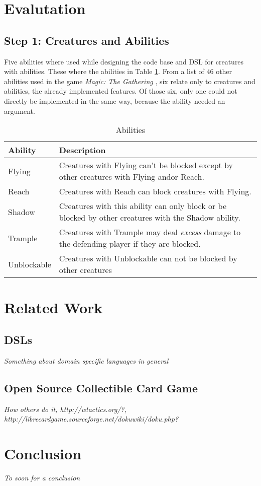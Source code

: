\documentclass[twocolumn]{phdsymp}
\begin{document}
\section{Evalutation}
\label{Evaluation}
\subsection*{Step 1: Creatures and Abilities}
Five abilities where used while designing the code base and DSL for creatures with abilities. These where the abilities in Table \ref{table:Abilities}. From a list of $46$ other abilities used in the game \textit{Magic: The Gathering} \cite{magic-abilities}, six relate only to creatures and abilities, the already implemented features. Of those six, only one could not directly be implemented in the same way, because the ability needed an argument.
\begin{table}[h]
\caption{Abilities}
\label{table:Abilities}
\begin{tabular}{|l|p{}|}
\hline
Ability & Description \\ \hline
Flying & Creatures with Flying can't be blocked except by other creatures with Flying and\/or Reach. \\
Reach & Creatures with Reach can block creatures with Flying. \\
Shadow & Creatures with this ability can only block or be  blocked by other creatures with the Shadow ability. \\
Trample & Creatures with Trample may deal \textit{excess} damage to the defending player if they are blocked. \\
Unblockable & Creatures with Unblockable can not be blocked by other creatures \\
\hline
\end{tabular}
\end{table}

\section{Related Work}
\label{Related Work}
\subsection{DSLs}
\textit{Something about domain specific languages in general}

\subsection{Open Source Collectible Card Game}
\textit{How others do it, http://wtactics.org/?, http://librecardgame.sourceforge.net/dokuwiki/doku.php?}

\section{Conclusion}
\label{Conclusion}
\textit{To soon for a conclusion}



\end{document}
